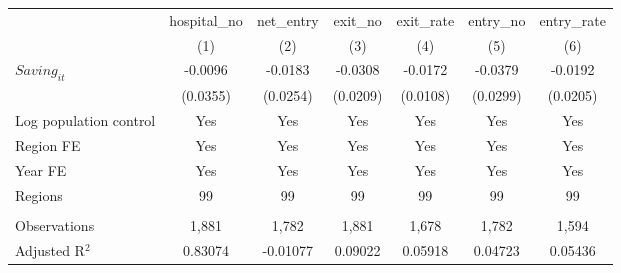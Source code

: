 \begingroup
\centering
\begin{tabular}{lcccccc}
   \toprule
                          & hospital\_no  & net\_entry  & exit\_no  & exit\_rate  & entry\_no  & entry\_rate \\    
                          & (1)           & (2)         & (3)       & (4)         & (5)        & (6)\\  
   \midrule 
   $Saving_{it}$          & -0.0096       & -0.0183     & -0.0308   & -0.0172     & -0.0379    & -0.0192\\   
                          & (0.0355)      & (0.0254)    & (0.0209)  & (0.0108)    & (0.0299)   & (0.0205)\\   
   Log population control & Yes           & Yes         & Yes       & Yes         & Yes        & Yes\\  
   Region FE              & Yes           & Yes         & Yes       & Yes         & Yes        & Yes\\  
   Year FE                & Yes           & Yes         & Yes       & Yes         & Yes        & Yes\\  
   Regions                & 99            & 99          & 99        & 99          & 99         & 99\\  
    \\
   Observations           & 1,881         & 1,782       & 1,881     & 1,678       & 1,782      & 1,594\\  
   Adjusted R$^2$         & 0.83074       & -0.01077    & 0.09022   & 0.05918     & 0.04723    & 0.05436\\  
   \bottomrule
\end{tabular}
\par\endgroup
